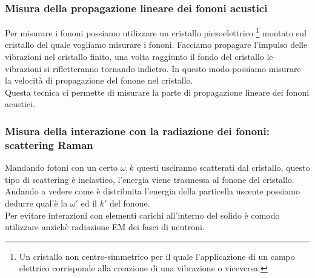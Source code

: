 \subsubsection{Misura della propagazione lineare dei fononi acustici}
\label{subsubsec:Misura della propagazione lineare dei fononi acustici}
Per misurare i fononi possiamo utilizzare un cristallo piezoelettrico \footnote{Un cristallo non centro-simmetrico per il quale l'applicazione di un campo elettrico corrisponde alla creazione di una vibrazione o viceversa.} montato sul cristallo del quale vogliamo misurare i fononi. Facciamo propagare l'impulso delle vibrazioni nel cristallo finito, una volta raggiunto il fondo del cristallo le vibrazioni si rifletteranno tornando indietro. In questo modo possiamo misurare la velocità di propagazione del fonone nel  cristallo. \\
Questa tecnica ci permette di misurare la parte di propagazione lineare dei fononi acustici. 
\subsubsection{Misura della interazione con la radiazione dei fononi: scattering Raman}
\label{subsubsec:Misura della interazione con la radiazione dei fononi}
Mandando fotoni con un certo $\omega , k$ questi usciranno scatterati dal cristallo, questo tipo di scattering è inelastico, l'energia viene trasmessa al fonone del cristallo.\\
Andando a vedere come è distribuita l'energia della particella uscente possiamo dedurre qual'è la $\omega '$ ed il $k'$ del fonone.\\
Per evitare interazioni con elementi carichi all'interno del solido è comodo utilizzare anzichè radiazione EM dei fasci di neutroni.
